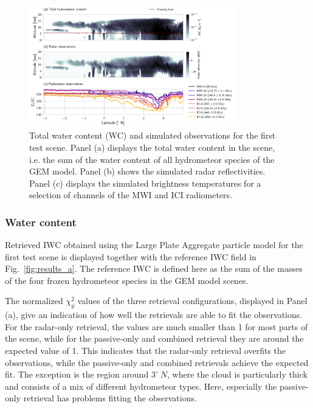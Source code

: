 \documentclass[journal abbreviation, manuscript]{copernicus}
\begin{document}
\begin{figure}
\centering \includegraphics[width = 0.8\textwidth]{../plots/observations_a}
\caption{Total water content (WC) and simulated observations for the first test
  scene. Panel (a) displays the total water content in the scene, i.e. the sum
  of the water content of all hydrometeor species of the GEM model. Panel (b)
  shows the simulated radar reflectivities. Panel (c) displays the simulated
  brightness temperatures for a selection of channels of the MWI and ICI
  radiometers.}
\label{fig:observations_a}
\end{figure}

\subsubsection{Water content}

Retrieved IWC obtained using the Large Plate Aggregate particle model for the
first test scene is displayed together with the reference IWC field in
Fig.~\ref{fig:results_a}. The reference IWC is defined here as the sum of the
masses of the four frozen hydrometeor species in the GEM model scenes.

The normalized $\chi^2_y$ values of the three retrieval configurations,
displayed in Panel (a), give an indication of how well the retrievals are able
to fit the observations. For the radar-only retrieval, the values are much
smaller than 1 for most parts of the scene, while for the passive-only and
combined retrieval they are around the expected value of 1. This indicates that
the radar-only retrieval overfits the observations, while the passive-only and
combined retrievals achieve the expected fit. The exception is the region around
$3^\circ\ N$, where the cloud is particularly thick and consists of a mix of
different hydrometeor types. Here, especially the passive-only retrieval has
problems fitting the observations.
\end{document}
